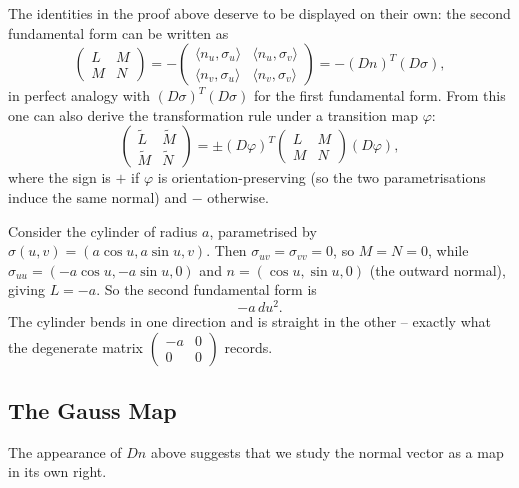 \documentclass[a4paper]{scrartcl}
\begin{document}
The identities in the proof above deserve to be displayed on their own: the second fundamental form can be written as
$$
\begin{pmatrix} L & M \\ M & N \end{pmatrix} = -\begin{pmatrix} \langle n_u , \sigma_u \rangle & \langle n_u, \sigma_v \rangle \\ \langle n_v, \sigma_u \rangle & \langle n_v, \sigma_v \rangle \end{pmatrix} = -(Dn)^T (D\sigma),
$$
in perfect analogy with $(D\sigma)^T(D\sigma)$ for the first fundamental form. From this one can also derive the transformation rule under a transition map $\varphi$:
$$
\begin{pmatrix} \tilde L & \tilde M \\ \tilde M & \tilde N \end{pmatrix} = \pm (D\varphi)^T \begin{pmatrix} L & M \\ M & N\end{pmatrix} (D\varphi),
$$
where the sign is $+$ if $\varphi$ is orientation-preserving (so the two parametrisations induce the same normal) and $-$ otherwise.

\begin{example}
    Consider the cylinder of radius $a$, parametrised by $\sigma(u, v) = (a \cos u, a \sin u, v)$. Then $\sigma_{uv} = \sigma_{vv} = 0$, so $M = N = 0$, while $\sigma_{uu} = (-a\cos u, -a \sin u, 0)$ and $n = (\cos u, \sin u, 0)$ (the outward normal), giving $L = -a$. So the second fundamental form is
    $$
    -a \, du^2.
    $$
    The cylinder bends in one direction and is straight in the other -- exactly what the degenerate matrix $\begin{pmatrix} -a & 0 \\ 0 & 0\end{pmatrix}$ records.
\end{example}

\subsection{The Gauss Map}

The appearance of $Dn$ above suggests that we study the normal vector as a map in its own right.
\end{document}
